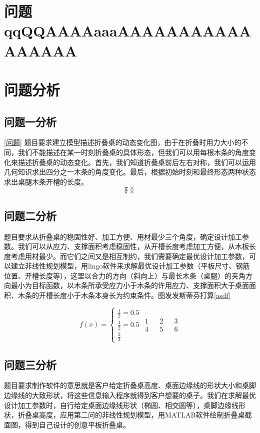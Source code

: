 \documentclass[bwprint]{gmcmthesis}
\begin{document}

\section{问题qqQQAAAAaaaAAAAAAAAAAAAAAAAA}
\section{问题分析}

\subsection{问题一分析}
\ref{问题}
题目要求建立模型描述折叠桌的动态变化图，由于在折叠时用力大小的不同，我们不能描述在某一时刻折叠桌的具体形态，但我们可以用每根木条的角度变化来描述折叠桌的动态变化。首先，我们知道折叠桌前后左右对称，我们可以运用几何知识求出四分之一木条的角度变化。最后，根据初始时刻和最终形态两种状态求出桌腿木条开槽的长度。
$$\pi\times$$
\begin{equation}
\pi\times
\end{equation}


\subsection{问题二分析}
题目要求从折叠桌的稳固性好、加工方便、用材最少三个角度，确定设计加工参数。我们可以从应力、支撑面积考虑稳固性，从开槽长度考虑加工方便，从木板长度考虑用材最少。而它们之间又是相互制约，我们需要确定最优设计加工参数，可以建立非线性规划模型，用lingo软件来求解最优设计加工参数（平板尺寸、钢筋位置、开槽长度等），这里以合力的方向（斜向上）与最长木条（桌腿）的夹角方向最小为目标函数，以木条所承受应力小于木条的许用应力、支撑面积大于桌面面积、木条的开槽长度小于木条本身长为约束条件。图发发斯蒂芬打算\ref{asdf}

\begin{equation}
    f(x) = \begin{cases}
        \frac{1}{2} = 0.5 \\
        \frac{1}{2} = 0.5 \\
        \frac{2}{3}
    \end{cases}\label{asdf}
    \begin{matrix}
        1 && 2 && 3 \\
        4 && 5 && 6
    \end{matrix}
\end{equation}

\subsection{问题三分析}
题目要求制作软件的意思就是客户给定折叠桌高度、桌面边缘线的形状大小和桌脚边缘线的大致形状，将这些信息输入程序就得到客户想要的桌子。我们在求解最优设计加工参数时，自行给定桌面边缘线形状（椭圆、相交圆等），桌脚边缘线形状，折叠桌高度，应用第二问的非线性规划模型，用MATLAB软件绘制折叠桌截面图，得到自己设计的创意平板折叠桌。
\end{document}
